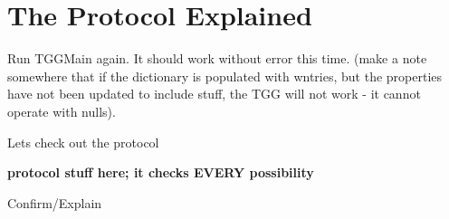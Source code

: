 \newpage
\section{The Protocol Explained}
\genHeader


Run TGGMain again. It should work without error this time. (make a note somewhere that if the dictionary is populated with wntries, but the properties have not
been updated to include stuff, the TGG will not work - it cannot operate with nulls).

Lets check out the protocol

{\bf protocol stuff here; it checks EVERY possibility}

Confirm/Explain
